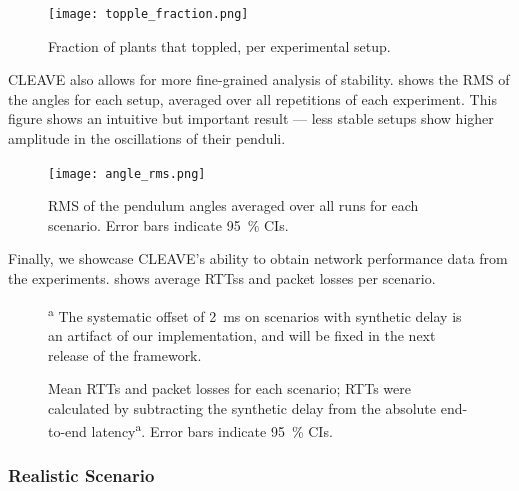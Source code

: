 \begin{figure}
    \centering
    \texttt{[image: topple\_fraction.png]}
    \caption{Fraction of plants that toppled, per experimental setup.}%
    \label{fig:topple:fraction}
\end{figure}

\Ac{CLEAVE} also allows for more fine-grained analysis of stability.
 shows the \ac{RMS} of the angles for each setup, averaged over all repetitions of each experiment.
This figure shows an intuitive but important result --- less stable setups show higher amplitude in the oscillations of their penduli.

\begin{figure}
    \centering
    \texttt{[image: angle\_rms.png]}
    \caption{\Ac{RMS} of the pendulum angles averaged over all runs for each scenario.
    Error bars indicate \SI{95}{\percent} \acp{CI}.}%
    \label{fig:topple:rms}
\end{figure}

Finally, we showcase \ac{CLEAVE}'s ability to obtain network performance data from the experiments.
 shows average \acp{RTT}s and packet losses per scenario.

\begin{figure}
    \centering
    \caption[caption]{Mean \acp{RTT} and packet losses for each scenario; \acp{RTT} were calculated by subtracting the synthetic delay from the absolute end-to-end latency\textsuperscript{a}. Error bars indicate \SI{95}{\percent} \acp{CI}.}%
    \small\textsuperscript{a} The systematic offset of \SI{2}{\milli\second} on scenarios with synthetic delay is an artifact of our implementation, and will be fixed in the next release of the framework.
    \label{fig:network}
\end{figure}



\subsubsection{Realistic Scenario}

